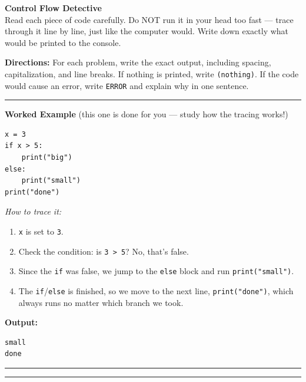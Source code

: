 \documentclass[11pt]{article}
\begin{document}
\begin{center}
    {\Large \textbf{Control Flow Detective}}\\[2mm]
    {\normalsize Read each piece of code carefully. Do NOT run it in your head too fast --- trace through it
    line by line, just like the computer would. Write down exactly what would be printed to the console.}
\end{center}

\vspace{4mm}
\noindent\textbf{Directions:} For each problem, write the exact output, including spacing, capitalization,
and line breaks. If nothing is printed, write \texttt{(nothing)}. If the code would cause an error,
write \texttt{ERROR} and explain why in one sentence.

\vspace{4mm}
\hrule
\vspace{4mm}

\noindent\textbf{Worked Example} \quad (this one is done for you --- study how the tracing works!)

\begin{lstlisting}
x = 3
if x > 5:
    print("big")
else:
    print("small")
print("done")
\end{lstlisting}

\noindent\textit{How to trace it:}
\begin{enumerate}[nosep]
    \item \texttt{x} is set to \texttt{3}.
    \item Check the condition: is \texttt{3 > 5}? No, that's false.
    \item Since the \texttt{if} was false, we jump to the \texttt{else} block and run \texttt{print("small")}.
    \item The \texttt{if}/\texttt{else} is finished, so we move to the next line, \texttt{print("done")}, which always runs no matter which branch we took.
\end{enumerate}

\noindent\textbf{Output:}
\begin{lstlisting}[frame=none,numbers=none,backgroundcolor=\color{white}]
small
done
\end{lstlisting}

\vspace{4mm}
\hrule

\vspace{2mm}

\vspace{4mm}
\hrule
\vspace{2mm}
\end{document}
